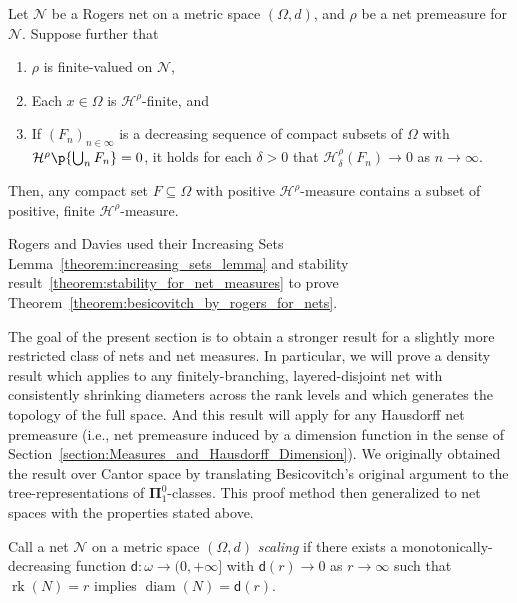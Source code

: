 \begin{theorem}
    \label{theorem:besicovitch_by_rogers_for_nets}
    Let $\mathcal{N}$ be a Rogers net on a metric space $(\Omega, d)$, and $\rho$ be a net premeasure for $\mathcal{N}$. Suppose further that
    \begin{enumerate}[label = (\roman*)]
        \item $\rho$ is finite-valued on $\mathcal{N}$,
        \item Each $x \in \Omega$ is $\mathcal{H}^\rho$-finite, and
        \item If $(F_n)_{n \in \infty}$ is a decreasing sequence of compact subsets of $\Omega$ with $\mathcal{H}^\rho\p{\bigcup_n F_n} = 0$, it holds for each $\delta > 0$ that $\mathcal{H}^\rho_\delta(F_n) \to 0$ as $n \to \infty$.
    \end{enumerate}
    Then, any compact set $F \subseteq \Omega$ with positive $\mathcal{H}^\rho$-measure contains a subset of positive, finite $\mathcal{H}^\rho$-measure.
\end{theorem}

Rogers and Davies used their Increasing Sets Lemma~\ref{theorem:increasing_sets_lemma} and stability result~\ref{theorem:stability_for_net_measures} to prove Theorem~\ref{theorem:besicovitch_by_rogers_for_nets}. 

The goal of the present section is to obtain a stronger result for a slightly more restricted class of nets and net measures. In particular, we will prove a density result which applies to any finitely-branching, layered-disjoint net with consistently shrinking diameters across the rank levels and which generates the topology of the full space. And this result will apply for any Hausdorff net premeasure (i.e., net premeasure induced by a dimension function in the sense of Section~\ref{section:Measures_and_Hausdorff_Dimension}). We originally obtained the result over Cantor space by translating Besicovitch's original argument to the tree-representations of $\boldsymbol{\Pi}^0_1$-classes. This proof method then generalized to net spaces with the properties stated above. 

\begin{definition}
    Call a net $\mathcal{N}$ on a metric space $(\Omega, d)$ \textit{scaling} if there exists a monotonically-decreasing function $\mathsf{d} : \omega \to (0, +\infty]$ with $\mathsf{d}(r) \to 0$ as $r \to \infty$ such that $\operatorname{rk}(N) = r$ implies $\operatorname{diam}(N) = \mathsf{d}(r)$. 
\end{definition}

